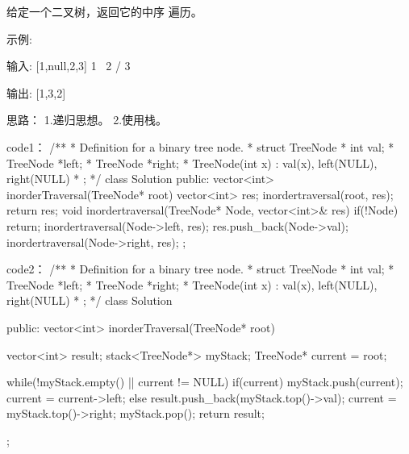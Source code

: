 给定一个二叉树，返回它的中序 遍历。

示例:

输入: [1,null,2,3]
   1
    \
     2
    /
   3

输出: [1,3,2]






















思路：
1.递归思想。
2.使用栈。

















code1：
/**
 * Definition for a binary tree node.
 * struct TreeNode {
 *     int val;
 *     TreeNode *left;
 *     TreeNode *right;
 *     TreeNode(int x) : val(x), left(NULL), right(NULL) {}
 * };
 */
class Solution {
public:
    vector<int> inorderTraversal(TreeNode* root) {
        vector<int> res;
        inordertraversal(root, res);
        return res;
    }
    void inordertraversal(TreeNode* Node, vector<int>& res)
    {
        if(!Node) return;
        inordertraversal(Node->left, res);
        res.push_back(Node->val);
        inordertraversal(Node->right, res);
    }
};








code2：
/**
 * Definition for a binary tree node.
 * struct TreeNode {
 *     int val;
 *     TreeNode *left;
 *     TreeNode *right;
 *     TreeNode(int x) : val(x), left(NULL), right(NULL) {}
 * };
 */
class Solution {
public:
    vector<int> inorderTraversal(TreeNode* root) {
        vector<int> result;
        stack<TreeNode*> myStack;
        TreeNode* current = root;
        
        while(!myStack.empty() || current != NULL)
        {
            if(current)
            {
                myStack.push(current);
                current = current->left;
            }
            else
            {
                result.push_back(myStack.top()->val);
                current = myStack.top()->right;
                myStack.pop();
            }
        }
        return result;
    }
};